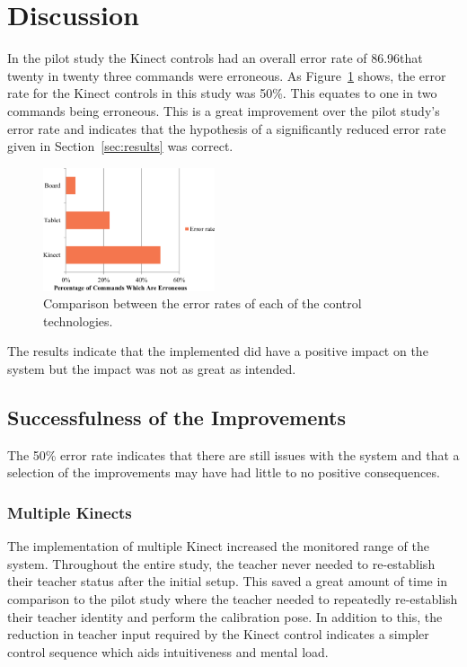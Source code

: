 \documentclass[link]{IWCOMP}
\begin{document}
\section{Discussion}
\label{sec:discussion}


In the pilot study the Kinect controls had an overall error rate of 86.96\meaning that twenty in twenty three commands were erroneous.
As Figure~\ref{fig:controlDevicesErrors} shows, the error rate for the Kinect controls in this study was 50\%.
This equates to one in two commands being erroneous.
This is a great improvement over the pilot study's error rate and indicates that the hypothesis of a significantly reduced error rate given in Section~\ref{sec:results} was correct.

\begin{figure}[h]
  \centering
  \includegraphics[width=0.45\textwidth]{figures/bar_chart_errors.png}
  \caption{Comparison between the error rates of each of the control technologies.}
  \label{fig:controlDevicesErrors}
\end{figure}

The results indicate that the implemented did have a positive impact on the system but the impact was not as great as intended.

\subsection{Successfulness of the Improvements}
\label{subsec:discussionSuccess}

The 50\% error rate indicates that there are still issues with the system and that a selection of the improvements may have had little to no positive consequences.

\subsubsection{Multiple Kinects}
\label{subsubsec:discussionSuccessMultipleKinects}

The implementation of multiple Kinect increased the monitored range of the system.
Throughout the entire study, the teacher never needed to re-establish their teacher status after the initial setup.
This saved a great amount of time in comparison to the pilot study where the teacher needed to repeatedly re-establish their teacher identity and perform the calibration pose.
In addition to this, the reduction in teacher input required by the Kinect control indicates a simpler control sequence which aids intuitiveness and mental load.
\end{document}
